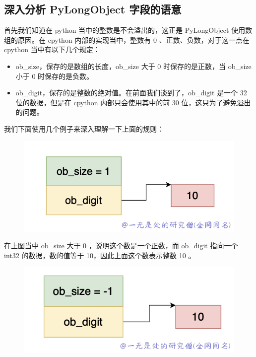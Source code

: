 \subsection{深入分析 PyLongObject 字段的语意}
首先我们知道在 python 当中的整数是不会溢出的，这正是 PyLongObject 使用数组的原因。在 cpython 内部的实现当中，整数有 0 、正数、负数，对于这一点在 cpython 当中有以下几个规定：
\begin{itemize}
\item ob\_size，保存的是数组的长度，ob\_size 大于 0 时保存的是正数，当 ob\_size 小于 0 时保存的是负数。 
\item ob\_digit，保存的是整数的绝对值。在前面我们谈到了，ob\_digit 是一个 32 位的数据，但是在 cpython 内部只会使用其中的前 30 位，这只为了避免溢出的问题。 
\end{itemize}
我们下面使用几个例子来深入理解一下上面的规则：

    \begin{figure}[h]
        \centering
            \includegraphics[scale=.3]{images/16-int.png}
            \caption{ }
        \label{fig:my_label}
    \end{figure}
    
在上图当中 ob\_size  大于 0 ，说明这个数是一个正数，而 ob\_digit 指向一个 int32 的数据，数的值等于 10，因此上面这个数表示整数 10 。

    \begin{figure}[h]
        \centering
            \includegraphics[scale=.3]{images/17-int.png}
            \caption{ }
        \label{fig:my_label}
    \end{figure}
    
